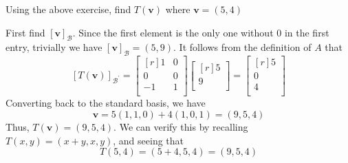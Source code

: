 \begin{exercise}
    Using the above exercise, find \(T(\mathbf{v})\) where \(\mathbf{v}=(5,4)\) 
\end{exercise}
\begin{solution}
    First find \([\mathbf{v}]_\mathcal{B} \). Since the first element is the only one without \(0\) in the first entry, trivially we have \([\mathbf{v}]_\mathcal{B} =(5,9)\). It follows from the definition of \(A\) that 
    \[
        [T(\mathbf{v})]_{\mathcal{B} ^{\prime} } = \begin{bmatrix}[r]
            1 &0   \\
             0&0   \\
             -1&1   \\
        \end{bmatrix} \begin{bmatrix}[r]
             5 \\
             9 \\
        \end{bmatrix} = \begin{bmatrix}[r]
             5 \\
             0 \\
             4 \\
        \end{bmatrix}
    \]
    Converting back to the standard basis, we have 
    \[
        \mathbf{v}= 5(1,1,0) + 4(1,0,1) = (9,5,4)
    \]
    Thus, \(T(\mathbf{v}) = (9,5,4)\). We can verify this by recalling \(T(x,y)=(x+y,x,y)\), and seeing that 
    \[
        T(5,4) = (5+4,5,4)=(9,5,4)
    \]
\end{solution}
